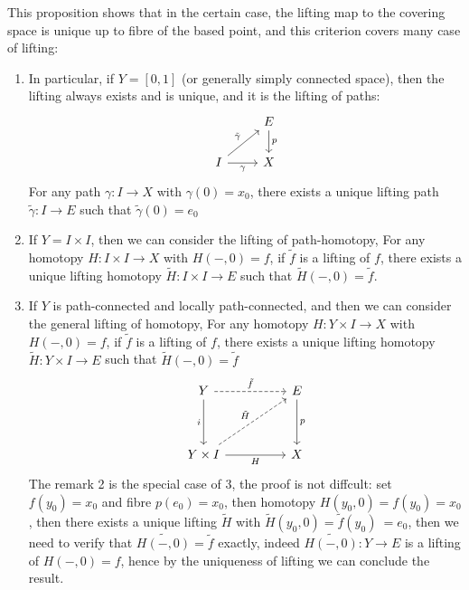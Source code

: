 \documentclass[12pt,a4paper]{article}
\begin{document}
\begin{remark}
    This proposition shows that in the certain case, the lifting map to the covering space is unique up to fibre of the based point, and this criterion covers many case of lifting:
    \begin{enumerate}
        \item In particular, if \(Y=[0,1]\) (or generally simply connected space), then the lifting always exists and is unique, and it is the lifting of paths:
\[\begin{tikzcd}
	& E \\
	I & X
	\arrow["p", from=1-2, to=2-2]
	\arrow["{\tilde{\gamma}}", from=2-1, to=1-2]
	\arrow["\gamma"', from=2-1, to=2-2]
\end{tikzcd}\]
        For any path \(\gamma: I \to X\) with \(\gamma(0) = x_0\), there exists a unique lifting path \(\tilde{\gamma}: I \to E\) such that \(\tilde{\gamma}(0) = e_0\)
       
        \item If \(Y= I \times I\), then we can consider the lifting of path-homotopy, For any homotopy \(H: I \times I \to X\) with \(H(-,0) = f\), if \(\tilde{f}\) is a lifting of \(f\), there exists a unique lifting homotopy \(\tilde{H}: I \times I \to E\) such that \(\tilde{H}(-,0) = \tilde{f}\).
        
        \item If \(Y\) is path-connected and locally path-connected, and then we can consider the general lifting of homotopy, For any homotopy \(H: Y \times I \to X\) with \(H(-,0) = f\), if \(\tilde{f}\) is a lifting of \(f\), there exists a unique lifting homotopy \(\tilde{H}: Y \times I \to E\) such that \(\tilde{H}(-,0) = \tilde{f}\)
\[\begin{tikzcd}
	Y && E \\
	\\
	{Y\times I} && X
	\arrow["{\tilde{f}}", dashed, from=1-1, to=1-3]
	\arrow["i"', from=1-1, to=3-1]
	\arrow["p", from=1-3, to=3-3]
	\arrow["{\tilde{H}}", dashed, from=3-1, to=1-3]
	\arrow["H"', from=3-1, to=3-3]
\end{tikzcd}\]
    The remark 2 is the special case of 3, the proof is not diffcult: set \(f(y_0) = x_0\) and fibre \(p(e_0) = x_0\), then homotopy \(H(y_0,0) = f(y_0) = x_0\), then there exists a unique lifting \(\tilde{H}\) with \(\tilde{H}(y_0,0) = \tilde{f}(y_0)\ = e_0\), then we need to verify that \(\tilde{H(-,0)} = \tilde{f}\) exactly, indeed \(\tilde{H(-,0)}:Y \to E\) is a lifting of \(H(-,0) = f\), hence by the uniqueness of lifting we can conclude the result.
    \end{enumerate}
\end{remark}
\end{document}
